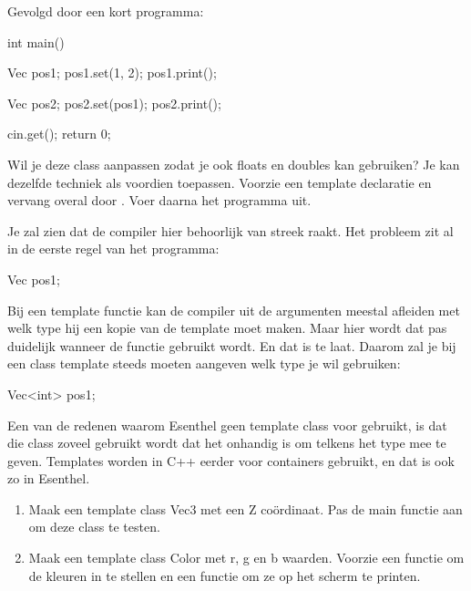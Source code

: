 \documentclass[11pt, oldfontcommands, oneside, a4paper]{memoir}
\begin{document}
Gevolgd door een kort programma:

\begin{code}
int main() {
  Vec pos1;
  pos1.set(1, 2);
  pos1.print();

  Vec pos2;
  pos2.set(pos1);
  pos2.print();

  cin.get();
  return 0;
}
\end{code}

Wil je deze class aanpassen zodat je ook floats en doubles kan gebruiken? Je kan dezelfde techniek als voordien toepassen. Voorzie een template declaratie en vervang  overal door . Voer daarna het programma uit.

Je zal zien dat de compiler hier behoorlijk van streek raakt. Het probleem zit al in de eerste regel van het programma:

\begin{code}
Vec pos1;
\end{code}

Bij een template functie kan de compiler uit de argumenten meestal afleiden met welk type hij een kopie van de template moet maken. Maar hier wordt dat pas duidelijk wanneer de functie  gebruikt wordt. En dat is te laat. Daarom zal je bij een class template steeds moeten aangeven welk type je wil gebruiken:

\begin{code}
Vec<int> pos1;
\end{code}

\begin{note}
Een van de redenen waarom Esenthel geen template class voor  gebruikt, is dat die class zoveel gebruikt wordt dat het onhandig is om telkens het type mee te geven. Templates worden in C++ eerder voor containers gebruikt, en dat is ook zo in Esenthel.
\end{note}

\begin{exercise}
\begin{enumerate}
	\item Maak een template class Vec3 met een Z co\"ordinaat. Pas de main functie aan om deze class te testen.
	\item Maak een template class Color met r, g en b waarden. Voorzie een functie om de kleuren in te stellen en een functie om ze op het scherm te printen.
\end{enumerate}
\end{exercise}
\end{document}
